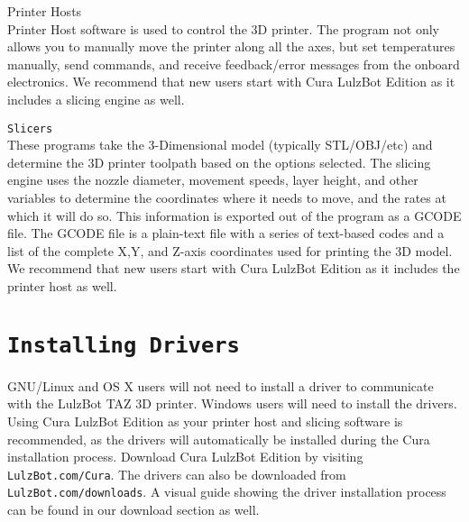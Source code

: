 \begin{description}
\item{Printer Hosts} \hfill \\
Printer Host software is used to control the 3D printer. The program not only allows you to manually move the printer along all the axes, but set temperatures manually, send commands, and receive feedback/error messages from the onboard electronics. We recommend that new users start with Cura LulzBot\textsuperscript{\miniscule{\textregistered}} Edition as it includes a slicing engine as well.

\item{\texttt{Slicers}} \hfill \\
These programs take the 3-Dimensional model (typically STL/OBJ/etc) and determine the 3D printer toolpath based on the options selected. The slicing engine uses the nozzle diameter, movement speeds, layer height, and other variables to determine the coordinates where it needs to move, and the rates at which it will do so. This information is exported out of the program as a GCODE file. The GCODE file is a plain-text file with a series of text-based codes and a list of the complete X,Y, and Z-axis coordinates used for printing the 3D model. We recommend that new users start with Cura LulzBot Edition as it includes the printer host as well.


\end{description}

\section{\texttt{Installing Drivers}}
GNU/Linux and OS X users will not need to install a driver to communicate with the LulzBot TAZ 3D printer. Windows users will need to install the drivers. Using Cura LulzBot Edition as your printer host and slicing software is recommended, as the drivers will automatically be installed during the Cura installation process. Download Cura LulzBot Edition by visiting \texttt{LulzBot.com/Cura}. The drivers can also be downloaded from \texttt{LulzBot.com/downloads}. A visual guide showing the driver installation process can be found in our download section as well.


